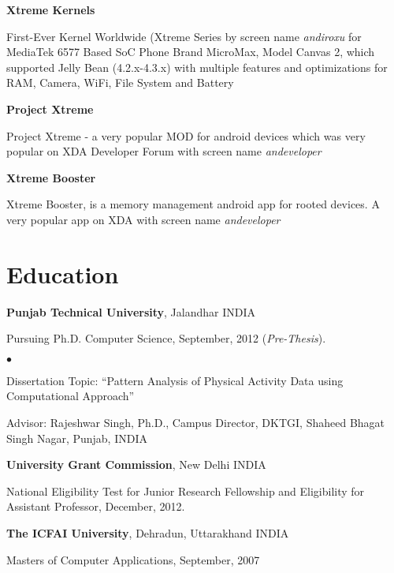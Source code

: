 \documentclass[margin,line]{res}
\newenvironment{list1}{
  \begin{list}{\ding{113}}{%
      \setlength{\itemsep}{0in}
      \setlength{\parsep}{0in} \setlength{\parskip}{0in}
      \setlength{\topsep}{0in} \setlength{\partopsep}{0in}
      \setlength{\leftmargin}{0.17in}}}{\end{list}}
\newenvironment{list2}{
  \begin{list}{$\bullet$}{%
      \setlength{\itemsep}{0in}
      \setlength{\parsep}{0in} \setlength{\parskip}{0in}
      \setlength{\topsep}{0in} \setlength{\partopsep}{0in}
      \setlength{\leftmargin}{0.2in}}}{\end{list}}
\begin{document}
\begin{resume}
\textbf{Xtreme Kernels} 

First-Ever Kernel Worldwide (Xtreme Series by screen name \textit{andiroxu} for MediaTek 6577 Based SoC Phone Brand MicroMax, Model Canvas 2, which supported Jelly Bean (4.2.x-4.3.x) with multiple features and optimizations for RAM, Camera, WiFi, File System and Battery 

\textbf{Project Xtreme} 

Project Xtreme - a very popular MOD for android devices which was very popular on XDA Developer Forum with screen name \textit{andeveloper}

\textbf{Xtreme Booster} 

Xtreme Booster, is a memory management android app for rooted devices. A very popular app on XDA with screen name \textit{andeveloper}


\section{\sc Education}
{\bf Punjab Technical University}, Jalandhar INDIA\\
\vspace*{-.1in}
\begin{list1}
\item[] Pursuing Ph.D. Computer Science, September, 2012 (\textit{Pre-Thesis}).
\begin{list2}
\vspace*{.05in}
\item Dissertation Topic:  ``Pattern Analysis of Physical Activity Data using Computational Approach''
\item Advisor:  Rajeshwar Singh, Ph.D., Campus Director, DKTGI, Shaheed Bhagat Singh Nagar, Punjab, INDIA
\end{list2}
\end{list1}

{\bf University Grant Commission}, New Delhi INDIA\\
\vspace*{-.1in}
\begin{list1}
\item[] National Eligibility Test for Junior Research Fellowship and Eligibility for Assistant Professor, December, 2012.
\end{list1}

{\bf The ICFAI University}, Dehradun, Uttarakhand INDIA\\
\vspace*{-.1in}
\begin{list1}
\item[] Masters of Computer Applications,  September, 2007
\end{list1}


\end{resume}
\end{document}
